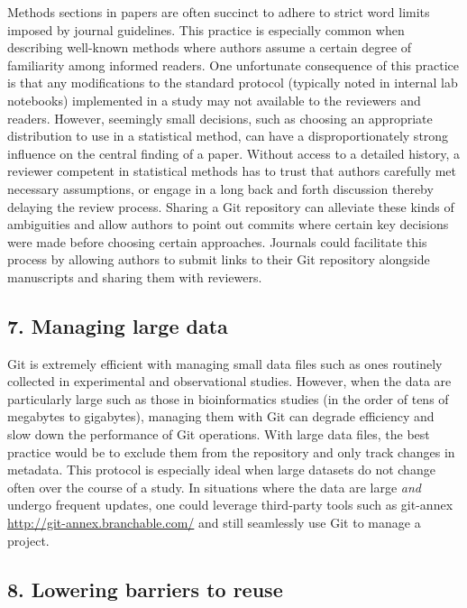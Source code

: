 \documentclass[]{article}
\begin{document}
Methods sections in papers are often succinct to adhere to strict word
limits imposed by journal guidelines. This practice is especially common
when describing well-known methods where authors assume a certain degree
of familiarity among informed readers. One unfortunate consequence of
this practice is that any modifications to the standard protocol
(typically noted in internal lab notebooks) implemented in a study may
not available to the reviewers and readers. However, seemingly small
decisions, such as choosing an appropriate distribution to use in a
statistical method, can have a disproportionately strong influence on
the central finding of a paper. Without access to a detailed history, a
reviewer competent in statistical methods has to trust that authors
carefully met necessary assumptions, or engage in a long back and forth
discussion thereby delaying the review process. Sharing a Git repository
can alleviate these kinds of ambiguities and allow authors to point out
commits where certain key decisions were made before choosing certain
approaches. Journals could facilitate this process by allowing authors
to submit links to their Git repository alongside manuscripts and
sharing them with reviewers.

\subsection{7. Managing large data}

Git is extremely efficient with managing small data files such as ones
routinely collected in experimental and observational studies. However,
when the data are particularly large such as those in bioinformatics
studies (in the order of tens of megabytes to gigabytes), managing them
with Git can degrade efficiency and slow down the performance of Git
operations. With large data files, the best practice would be to exclude
them from the repository and only track changes in metadata. This
protocol is especially ideal when large datasets do not change often
over the course of a study. In situations where the data are large
\emph{and} undergo frequent updates, one could leverage third-party
tools such as git-annex \url{http://git-annex.branchable.com/} and still
seamlessly use Git to manage a project.

\subsection{8. Lowering barriers to reuse}
\end{document}
